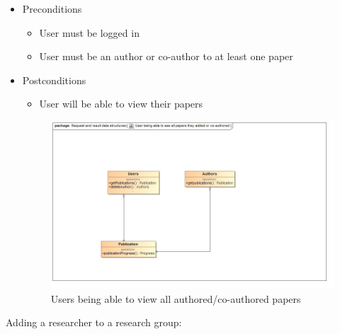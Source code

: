 \documentclass[a4paper,12pt]{article}
\begin{document}
\begin{itemize}
    \item Preconditions
    \begin{itemize}
        \item User must be logged in
        \item User must be an author or co-author to at least one paper
    \end{itemize}
    \item Postconditions
    \begin{itemize}
        \item User will be able to view their papers
    \end{itemize}
    
    \begin{figure}[H]
    \centering
    \caption{Users being able to view all authored/co-authored papers}
    \includegraphics[width=1\textwidth]{use-case/user-viewing-papers.png}
    \end{figure}
\end{itemize}
Adding a researcher to a research group:
\end{document}
